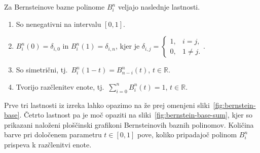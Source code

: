 \documentclass[isrm2, tisk]{fmfdelo}
\newcommand{\R}{\mathbb R}
\newcommand{\bernstein}[2]{\binom{#1}{#2}t^{#2}(1-t)^{#1-#2}}
\begin{document}
    \begin{izrek}
        Za Bernsteinove bazne polinome $B_i^n$ veljajo naslednje lastnosti.
        \label{izrek:bernsteinovi_lastnosti}
        \begin{enumerate}
            \item So nenegativni na intervalu $[0,1]$.\label{izrek:bernsteinovi_lastnosti:pozitivnost}
            \item $B_i^n(0) = \delta_{i,0}$ in $B_i^n(1) = \delta_{i,n}$, kjer je $\delta_{i,j} = \begin{cases}
                                                                                                      1, & i=j, \\
                                                                                                      0, & 1\neq j.
            \end{cases}.$
            \item So simetrični, tj.\ $B_i^n(1-t) = B^n_{n-i}(t)$, $t\in\R$. \label{izrek:bernsteinovi_lastnosti:simetrija}
            \item Tvorijo razčlenitev enote, tj.\  $\sum_{i=0}^{n}B_{i}^{n}(t) = 1$, $t\in\R$.\label{izrek:bernsteinovi_lastnosti:enota}
        \end{enumerate}
    \end{izrek}
    \noindent Prve tri lastnosti iz izreka lahko opazimo na že prej omenjeni sliki~\ref{fig:bernstein-base}.
    Četrto lastnost pa je moč opaziti na sliki~\ref{fig:bernstein-base-sum}, kjer so prikazani naloženi ploščinski grafikoni Bernsteinovih baznih polinomov. %
    Količina barve pri določenem parametru $t\in[0,1]$ pove, koliko pripadajoč polinom $B_i^n$ prispeva k razčlenitvi enote.
\end{document}

